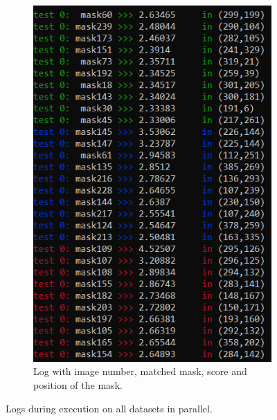 \documentclass{article}
\begin{document}
\begin{figure}[H]
\begin{subfigure}{.5\textwidth}
  \includegraphics[width=.9\linewidth]{Images/parallel_run.png}
\caption{Log with image number, matched mask, score and position of the mask.}
\end{subfigure}
  \caption{Logs during execution on all datasets in parallel.}
  \label{parallel_log}
\end{figure}
\end{document}
